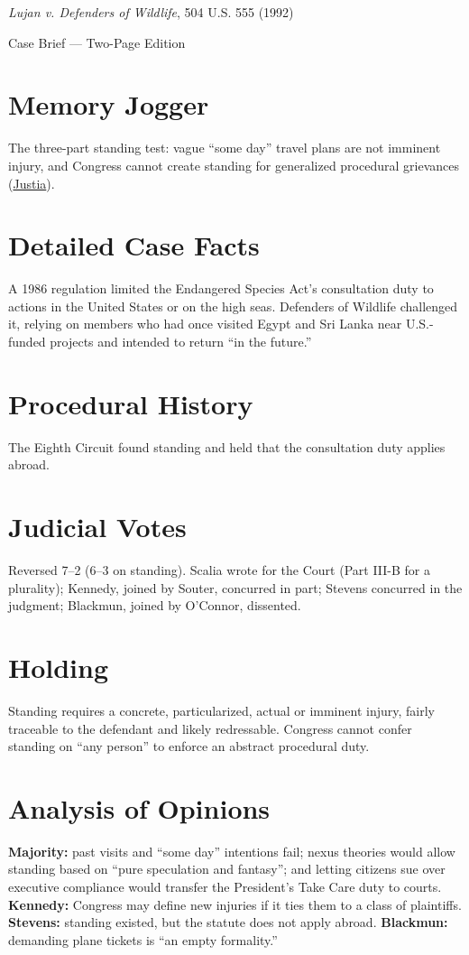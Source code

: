 \documentclass[12pt]{article}
\begin{document}
\begin{center}
{\LARGE \textit{Lujan v. Defenders of Wildlife}, 504 U.S. 555 (1992)\par}
\vspace{0.5em}
{\large Case Brief --- Two-Page Edition\par}
\end{center}

\section{Memory Jogger}
The three-part standing test: vague ``some day'' travel plans are not imminent injury, and Congress cannot create standing for generalized procedural grievances (\href{https://supreme.justia.com/cases/federal/us/504/555/}{Justia}).

\section{Detailed Case Facts}
A 1986 regulation limited the Endangered Species Act's consultation duty to actions in the United States or on the high seas. Defenders of Wildlife challenged it, relying on members who had once visited Egypt and Sri Lanka near U.S.-funded projects and intended to return ``in the future.''

\section{Procedural History}
The Eighth Circuit found standing and held that the consultation duty applies abroad.

\section{Judicial Votes}
Reversed 7--2 (6--3 on standing). Scalia wrote for the Court (Part III-B for a plurality); Kennedy, joined by Souter, concurred in part; Stevens concurred in the judgment; Blackmun, joined by O'Connor, dissented.

\section{Holding}
Standing requires a concrete, particularized, actual or imminent injury, fairly traceable to the defendant and likely redressable. Congress cannot confer standing on ``any person'' to enforce an abstract procedural duty.

\section{Analysis of Opinions}
\textbf{Majority:} past visits and ``some day'' intentions fail; nexus theories would allow standing based on ``pure speculation and fantasy''; and letting citizens sue over executive compliance would transfer the President's Take Care duty to courts. \textbf{Kennedy:} Congress may define new injuries if it ties them to a class of plaintiffs. \textbf{Stevens:} standing existed, but the statute does not apply abroad. \textbf{Blackmun:} demanding plane tickets is ``an empty formality.''
\end{document}
